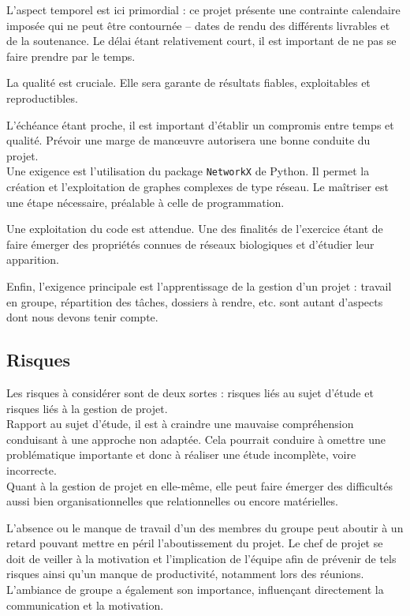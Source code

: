 L'aspect temporel est ici primordial : ce projet présente une contrainte calendaire imposée qui ne peut être contournée -- dates de rendu des différents livrables et de la soutenance. Le délai étant relativement court, il est important de ne pas se faire prendre par le temps.

La qualité est cruciale. Elle sera garante de résultats fiables, exploitables et reproductibles. 

L'échéance étant proche, il est important d'établir un compromis entre temps et qualité. Prévoir une marge de manœuvre autorisera une bonne conduite du projet.\\

Une exigence est l'utilisation du package \verb?NetworkX? de Python. Il permet la création et l'exploitation de graphes complexes de type réseau. Le maîtriser est une étape nécessaire, préalable à celle de programmation.

Une exploitation du code est attendue. Une des finalités de l'exercice étant de faire émerger des propriétés connues de réseaux biologiques et d'étudier leur apparition.

Enfin, l'exigence principale est l'apprentissage de la gestion d'un projet : travail en groupe, répartition des tâches, dossiers à rendre, etc. sont autant d'aspects dont nous devons tenir compte.

\subsection{Risques}
Les risques à considérer sont de deux sortes : risques liés au sujet d'étude et risques liés à la gestion de projet.\\

Rapport au sujet d'étude, il est à craindre une mauvaise compréhension conduisant à une approche non adaptée. Cela pourrait conduire à omettre une problématique importante et donc à réaliser une étude incomplète, voire incorrecte.\\

Quant à la gestion de projet en elle-même, elle peut faire émerger des difficultés aussi bien organisationnelles que relationnelles ou encore matérielles.

L'absence ou le manque de travail d'un des membres du groupe peut aboutir à un retard pouvant mettre en péril l'aboutissement du projet. Le chef de projet se doit de veiller à la motivation et l'implication de l'équipe afin de prévenir de tels risques ainsi qu'un manque de productivité, notamment lors des réunions. L'ambiance de groupe a également son importance, influençant directement la communication et la motivation.

